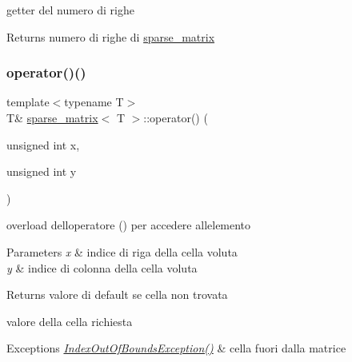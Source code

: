 getter del numero di righe 

\begin{DoxyReturn}{Returns}
numero di righe di \hyperlink{classsparse__matrix}{sparse\+\_\+matrix} 
\end{DoxyReturn}
\mbox{\label{classsparse__matrix_a3aa4aa24a43a2538b3e8c1371e01f006}} 
\subsubsection{\texorpdfstring{operator()()}{operator()()}}
{\footnotesize\ttfamily template$<$typename T$>$ \\
T\& \hyperlink{classsparse__matrix}{sparse\+\_\+matrix}$<$ T $>$\+::operator() (\begin{DoxyParamCaption}\item[{unsigned int}]{x,  }\item[{unsigned int}]{y }\end{DoxyParamCaption})\hspace{0.3cm}{\ttfamily [inline]}}



overload dell\textquotesingle{}operatore () per accedere all\textquotesingle{}elemento 


\begin{DoxyParams}{Parameters}
{\em x} & indice di riga della cella voluta \\
\hline
{\em y} & indice di colonna della cella voluta\\
\hline
\end{DoxyParams}
\begin{DoxyReturn}{Returns}
valore di default se cella non trovata 

valore della cella richiesta
\end{DoxyReturn}

\begin{DoxyExceptions}{Exceptions}
{\em \hyperlink{classIndexOutOfBoundsException}{Index\+Out\+Of\+Bounds\+Exception()}} & cella fuori dalla matrice \\
\hline
\end{DoxyExceptions}
\mbox{\label{classsparse__matrix_a9f9e8f69ee9ccf89849ec9a6a6b320f6}} 
